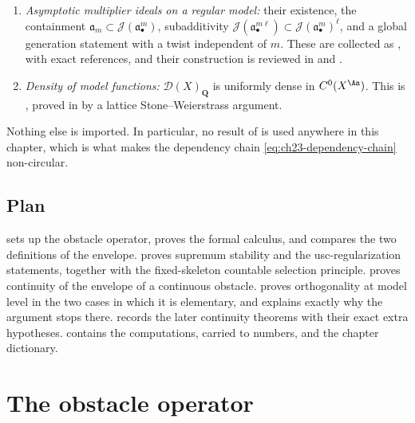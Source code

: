 \begin{enumerate}
\item \emph{Asymptotic multiplier ideals on a regular model:} their
existence, the containment \(\mathfrak a_m\subset\mathcal J(\mathfrak
a_\bullet^m)\), subadditivity
\(\mathcal J(\mathfrak a_\bullet^{m\ell})\subset\mathcal J(\mathfrak
a_\bullet^m)^\ell\), and a global generation statement with a twist
independent of \(m\).  These are collected as
, with exact references, and their
construction is reviewed in  and
.
\item \emph{Density of model functions:} \(\mathcal D(X)_{\mathbf Q}\) is
uniformly dense in \(C^0(X^{\An})\).  This is
, proved in 
by a lattice Stone--Weierstrass argument.
\end{enumerate}

Nothing else is imported.  In particular, no result of
 is used
anywhere in this chapter, which is what makes the dependency chain
\eqref{eq:ch23-dependency-chain} non-circular.

\subsection{Plan}
\label{sec:ch23-plan}

 sets up the obstacle operator, proves the
formal calculus, and compares the two definitions of the envelope.
 proves supremum stability and the
usc-regularization statements, together with the fixed-skeleton countable
selection principle.   proves continuity of the
envelope of a continuous obstacle.  
proves orthogonality at model level in the two cases in which it is
elementary, and explains exactly why the argument stops there.
 records the later continuity theorems with their exact
extra hypotheses.   contains the computations, carried
to numbers, and  the chapter dictionary.

\section{The obstacle operator}
\label{sec:ch23-obstacle-operator}

